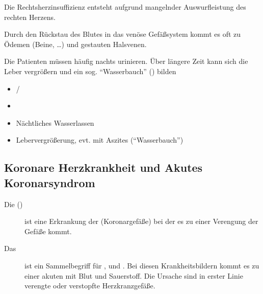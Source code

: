 Die Rechtsherzinsuffizienz entsteht aufgrund mangelnder Auswurfleistung
des rechten Herzens.

{
Durch den Rückstau des Blutes in das venöse Gefäßsystem
kommt es oft zu Ödemen (Beine, \ldots) und
gestauten Halsvenen. 

Die Patienten müssen häufig nachts urinieren. Über
längere Zeit kann sich die Leber vergrößern und ein sog.
"`Wasserbauch"' () bilden 
}{
\begin{itemize}
  \item {}/
  \item {}
  \item Nächtliches Wasserlassen
  \item Lebervergrößerung, evt. mit Aszites
  ("`Wasserbauch"')
\end{itemize}
}{}{}{}







\subsection{Koronare Herzkrankheit und Akutes Koronarsyndrom}


\begin{description}
  \item[Die 
  ()] ist eine Erkrankung der
   (Koronargefäße)
  bei der es zu einer Verengung der Gefäße kommt.
  \item[Das ] ist ein
  Sammelbegriff für ,  und .
  Bei diesen Krankheitsbildern kommt es zu einer akuten
   mit Blut und
  Sauerstoff. Die Ursache sind in erster Linie verengte oder verstopfte
  Herzkranzgefäße.
\end{description}

